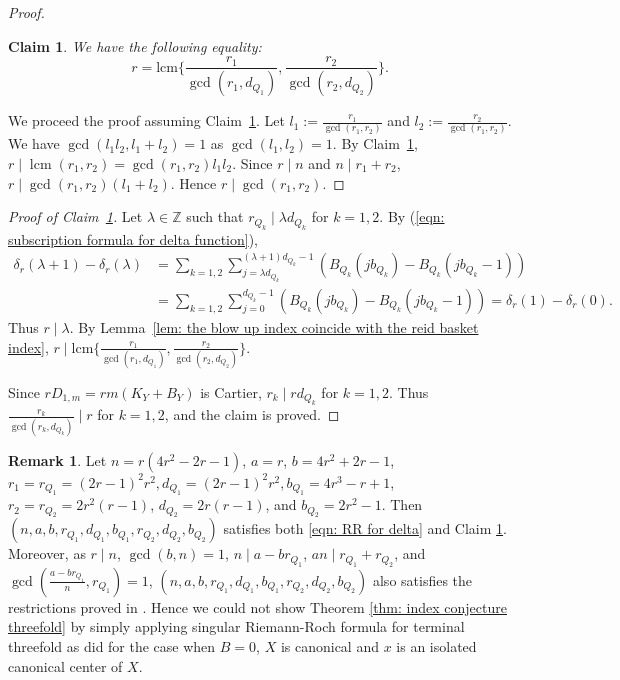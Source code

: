 \documentclass[11pt]{amsart}
\numberwithin{equation}{section}
\newcommand\han[1]{\todo[color=yellow!40]{#1}} %
\newcommand{\Zz}{\mathbb{Z}}
\newcommand{\lcm}{\operatorname{lcm}}
\newtheorem{claim}[thm]{Claim}
\theoremstyle{definition}
\newtheorem{rem}[thm]{Remark}
\theoremstyle{definition}
\begin{document}
\begin{proof}
\begin{claim}\label{claim: description of the index $r$}
We have the following equality:
$$r=\mathrm{lcm}\{ \frac{r_1}{\gcd(r_1,d_{Q_1})}, \frac{r_2}{\gcd(r_2,d_{Q_2})}\}.$$
\end{claim}

We proceed the proof assuming Claim~\ref{claim: description of the index $r$}. Let $l_1:=\frac{r_1}{\gcd(r_1,r_2)}$ and $l_2:=\frac{r_2}{\gcd(r_1,r_2)}$. We have $\gcd(l_1l_2,l_1+l_2)=1$ as $\gcd(l_1,l_2)=1$. By Claim~\ref{claim: description of the index $r$}, $r\mid  \lcm(r_1,r_2)=\gcd(r_1,r_2)l_1l_2$. Since $r\mid n$ and $n\mid r_1+r_2$, $r\mid \gcd(r_1,r_2)(l_1+l_2)$. Hence $r\mid \gcd(r_1,r_2)$.
\end{proof}

\begin{proof}[Proof of Claim~\ref{claim: description of the index $r$}]
Let $\lambda\in \Zz$ such that $r_{Q_k}\mid \lambda d_{Q_k}$ for $k=1,2$. By (\ref{eqn: subscription formula for delta function}),
\begin{align*}
    \delta_r(\lambda+1)-\delta_r(\lambda)&=\sum_{k=1,2}\sum_{j=\lambda d_{Q_k}}^{(\lambda+1)d_{Q_k}-1}(B_{Q_k}(jb_{Q_k})-B_{Q_k}(jb_{Q_k}-1))\\
    &=\sum_{k=1,2}\sum_{j=0}^{d_{Q_k}-1}(B_{Q_k}(jb_{Q_k})-B_{Q_k}(jb_{Q_k}-1))=\delta_r(1)-\delta_r(0).
\end{align*}
Thus $r\mid \lambda$. By Lemma~\ref{lem: the blow up index coincide with the reid basket index}, $r\mid \mathrm{lcm}\{ \frac{r_1}{\gcd(r_1,d_{Q_1})}, \frac{r_2}{\gcd(r_2,d_{Q_2})}\}$. 

Since $rD_{1,m}=rm(K_Y+B_Y)$ is Cartier, $r_{k}\mid rd_{Q_k}$ for $k=1,2$. Thus $\frac{r_{k}}{\gcd(r_{k},d_{Q_k})}\mid r$ for $k=1,2$, and the claim is proved.
\end{proof}


\begin{rem}
Let $n=r(4r^2-2r-1)$,
$a=r$, $b=4r^2+2r-1$,
$r_1=r_{Q_1}=(2r-1)^2r^2,d_{Q_1}=(2r-1)^2r^2,b_{Q_1}=4r^3-r+1$, $r_2=r_{Q_2}=2r^2(r-1)$, $d_{Q_2}=2r(r-1)$, and $b_{Q_2}=2r^2-1$. Then $(n,a,b,r_{Q_1},d_{Q_1},b_{Q_1},r_{Q_2},d_{Q_2},b_{Q_2})$ satisfies both \eqref{eqn: RR for delta} and Claim \ref{claim: description of the index $r$}. Moreover, as $r\mid n$, $\gcd(b,n)=1$, $n\mid a-br_{Q_1}$, $an\mid r_{Q_1}+r_{Q_2}$, and $\gcd(\frac{a-br_{Q_1}}{n},r_{Q_1})=1$, $(n,a,b,r_{Q_1},d_{Q_1},b_{Q_1},r_{Q_2},d_{Q_2},b_{Q_2})$ also satisfies the restrictions proved in \cite[Theorem~1.2(1)]{Kaw05}. Hence we could not show Theorem \ref{thm: index conjecture threefold} by simply applying singular Riemann-Roch formula for terminal threefold as \cite{Kaw15a} did for the case when $B=0$, $X$ is canonical and $x$ is an isolated canonical center of $X$.
\end{rem}
\end{document}

